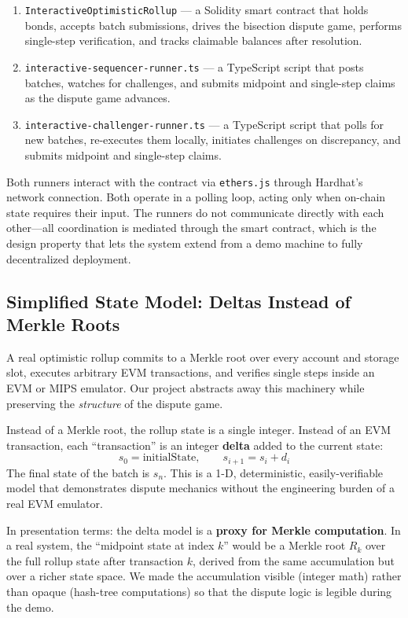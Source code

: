 \documentclass[11pt,letterpaper]{article}
\begin{document}
\begin{enumerate}[leftmargin=*, itemsep=2pt]
    \item \texttt{InteractiveOptimisticRollup} --- a Solidity smart contract that holds bonds, accepts batch submissions, drives the bisection dispute game, performs single-step verification, and tracks claimable balances after resolution.
    \item \texttt{interactive-sequencer-runner.ts} --- a TypeScript script that posts batches, watches for challenges, and submits midpoint and single-step claims as the dispute game advances.
    \item \texttt{interactive-challenger-runner.ts} --- a TypeScript script that polls for new batches, re-executes them locally, initiates challenges on discrepancy, and submits midpoint and single-step claims.
\end{enumerate}

Both runners interact with the contract via \texttt{ethers.js} through Hardhat's network connection. Both operate in a polling loop, acting only when on-chain state requires their input. The runners do not communicate directly with each other---all coordination is mediated through the smart contract, which is the design property that lets the system extend from a demo machine to fully decentralized deployment.

\subsection{Simplified State Model: Deltas Instead of Merkle Roots}

A real optimistic rollup commits to a Merkle root over every account and storage slot, executes arbitrary EVM transactions, and verifies single steps inside an EVM or MIPS emulator. Our project abstracts away this machinery while preserving the \emph{structure} of the dispute game.

Instead of a Merkle root, the rollup state is a single integer. Instead of an EVM transaction, each ``transaction'' is an integer \textbf{delta} added to the current state:
\[
s_0 = \text{initialState},\qquad s_{i+1} = s_i + d_i
\]
The final state of the batch is $s_n$. This is a 1-D, deterministic, easily-verifiable model that demonstrates dispute mechanics without the engineering burden of a real EVM emulator.

In presentation terms: the delta model is a \textbf{proxy for Merkle computation}. In a real system, the ``midpoint state at index $k$'' would be a Merkle root $R_k$ over the full rollup state after transaction $k$, derived from the same accumulation but over a richer state space. We made the accumulation visible (integer math) rather than opaque (hash-tree computations) so that the dispute logic is legible during the demo.
\end{document}
